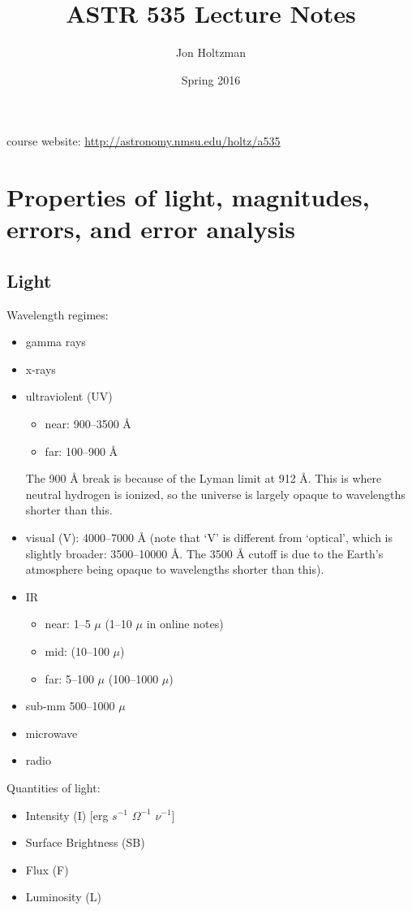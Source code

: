 \documentclass[12pt]{article}
\title{ASTR 535 Lecture Notes}
\author{Jon Holtzman}
\date{Spring 2016}
\begin{document}
\maketitle

\noindent course website: \textcolor{blue}{\url{http://astronomy.nmsu.edu/holtz/a535}}

\section*{Properties of light, magnitudes, errors, and error analysis}

\subsection*{Light}
Wavelength regimes:
\begin{itemize}
    \item gamma rays
    \item x-rays
    \item ultraviolent (UV)
        \begin{itemize}
            \item near: 900--3500 \AA{}
            \item far: 100--900 \AA{}
        \end{itemize}
        The 900 \AA{} break is because of the Lyman limit at 912 \AA{}.
        This is where neutral hydrogen is ionized, so the universe is largely
        opaque to wavelengths shorter than this.
    \item visual (V): 4000--7000 \AA{} (note that `V' is different from `optical',
        which is slightly broader: 3500--10000 \AA{}. The 3500 \AA{} cutoff
        is due to the Earth's atmosphere being opaque to wavelengths shorter
        than this).
    \item IR
        \begin{itemize}
            \item near: 1--5 $\mu$ (1--10 $\mu$ in online notes)
            \item mid: (10--100 $\mu$)
            \item far: 5--100 $\mu$ (100--1000 $\mu$)
        \end{itemize}
    \item sub-mm 500--1000 $\mu$
    \item microwave
    \item radio
\end{itemize}
Quantities of light:
\begin{itemize}
    \item Intensity (I) [erg $s^{-1}$ $\Omega^{-1}$ $\nu^{-1}$]
    \item Surface Brightness (SB)
    \item Flux (F)
    \item Luminosity (L)
\end{itemize}
\end{document}
